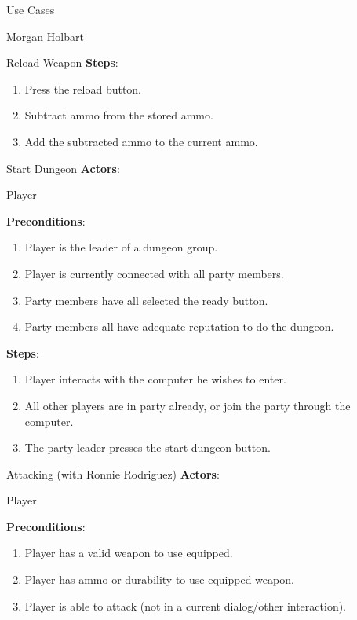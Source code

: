 \documentclass[12pt]{report}
\begin{document}
\begin{section}{Use Cases}
\begin{subsection}{Morgan Holbart}
\begin{subsubsection}{Reload Weapon}
\textbf{Steps}:

\begin{enumerate}
\item Press the reload button.
\item Subtract ammo from the stored ammo.
\item Add the subtracted ammo to the current ammo.
\end{enumerate}
\end{subsubsection}

\begin{subsubsection}{Start Dungeon}
\textbf{Actors}:

Player

\textbf{Preconditions}:

\begin{enumerate}
\item Player is the leader of a dungeon group.
\item Player is currently connected with all party members.
\item Party members have all selected the ready button.
\item Party members all have adequate reputation to do the dungeon.
\end{enumerate}

\textbf{Steps}:

\begin{enumerate}
\item Player interacts with the computer he wishes to enter.
\item All other players are in party already, or join the party through the
computer.
\item The party leader presses the start dungeon button.
\end{enumerate}
\end{subsubsection}

\begin{subsubsection}{Attacking (with Ronnie Rodriguez)}
\textbf{Actors}:

Player

\textbf{Preconditions}:

\begin{enumerate}
\item Player has a valid weapon to use equipped.
\item Player has ammo or durability to use equipped weapon.
\item Player is able to attack (not in a current dialog/other interaction).
\end{enumerate}


\end{subsubsection}
\end{subsection}
\end{section}
\end{document}
